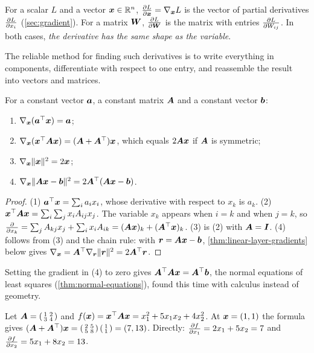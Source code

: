 \begin{notation}
For a scalar $L$ and a vector $\bm{x} \in \mathbb{R}^n$, $\frac{\partial L}{\partial \bm{x}} = \nabla_{\bm{x}}L$ is the
vector of partial derivatives $\frac{\partial L}{\partial x_i}$ (\cref{sec:gradient}). For a matrix
$\bm{W}$, $\frac{\partial L}{\partial \bm{W}}$ is the matrix with entries $\frac{\partial L}{\partial W_{ij}}$. In both
cases, \emph{the derivative has the same shape as the variable}.
\end{notation}

The reliable method for finding such derivatives is to write everything in
components, differentiate with respect to one entry, and reassemble the result
into vectors and matrices.

\begin{theorem}\label{thm:basic-gradients}
For a constant vector $\bm{a}$, a constant matrix $\bm{A}$ and a constant vector
$\bm{b}$:
\begin{enumerate}
  \item $\nabla_{\bm{x}}(\bm{a}^\top\bm{x}) = \bm{a}$;
  \item $\nabla_{\bm{x}}(\bm{x}^\top\bm{A}\bm{x}) = (\bm{A} + \bm{A}^\top)\bm{x}$, which equals
    $2\bm{A}\bm{x}$ if $\bm{A}$ is symmetric;
  \item $\nabla_{\bm{x}}\lVert\bm{x}\rVert^2 = 2\bm{x}$;
  \item $\nabla_{\bm{x}}\lVert\bm{A}\bm{x} - \bm{b}\rVert^2 = 2\bm{A}^\top(\bm{A}\bm{x} - \bm{b})$.
\end{enumerate}
\end{theorem}

\begin{proof}
(1) $\bm{a}^\top\bm{x} = \sum_ia_ix_i$, whose derivative with respect to $x_k$ is $a_k$.
(2) $\bm{x}^\top\bm{A}\bm{x} = \sum_i\sum_jx_iA_{ij}x_j$. The variable $x_k$ appears when
$i = k$ and when $j = k$, so
$\frac{\partial }{\partial x_k} = \sum_jA_{kj}x_j + \sum_ix_iA_{ik} = (\bm{A}\bm{x})_k + (\bm{A}^\top\bm{x})_k$.
(3) is (2) with $\bm{A} = \bm{I}$. (4) follows from (3) and the chain rule: with
$\bm{r} = \bm{A}\bm{x} - \bm{b}$, \cref{thm:linear-layer-gradients} below gives
$\nabla_{\bm{x}} = \bm{A}^\top\nabla_{\bm{r}}\lVert\bm{r}\rVert^2 = 2\bm{A}^\top\bm{r}$.
\end{proof}

Setting the gradient in (4) to zero gives $\bm{A}^\top\bm{A}\bm{x} = \bm{A}^\top\bm{b}$, the normal
equations of least squares (\cref{thm:normal-equations}), found this time with
calculus instead of geometry.

\begin{example}\label{ex:quadratic-gradient}
Let $\bm{A} = \left(\begin{smallmatrix} 1 & 2\\ 3 & 4\end{smallmatrix}\right)$ and
$f(\bm{x}) = \bm{x}^\top\bm{A}\bm{x} = x_1^2 + 5x_1x_2 + 4x_2^2$. At $\bm{x} = (1, 1)$ the formula
gives $(\bm{A} + \bm{A}^\top)\bm{x} = \left(\begin{smallmatrix} 2 & 5\\ 5 &
8\end{smallmatrix}\right)\left(\begin{smallmatrix} 1\\ 1\end{smallmatrix}\right)
= (7, 13)$. Directly: $\frac{\partial f}{\partial x_1} = 2x_1 + 5x_2 = 7$ and
$\frac{\partial f}{\partial x_2} = 5x_1 + 8x_2 = 13$. \checkmark
\end{example}

